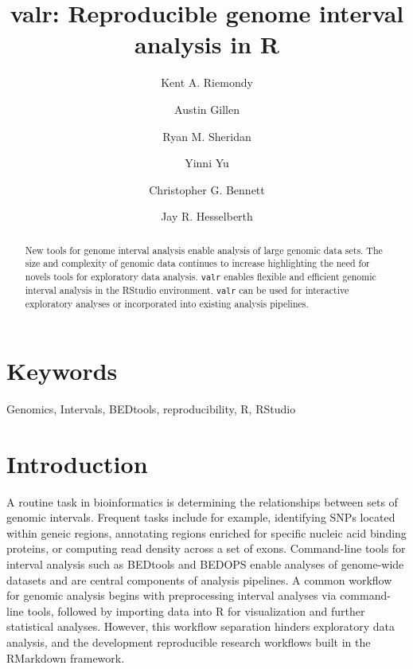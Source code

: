 \documentclass[9pt,a4paper]{extarticle}
\begin{document}
\pagestyle{front}

\title{valr: Reproducible genome interval analysis in R}
\author[1]{Kent A. Riemondy}
\author[1]{Austin Gillen}
\author[2]{Ryan M. Sheridan}
\author[2]{Yinni Yu}
\author[3]{Christopher G. Bennett}
\author[1,2,*]{Jay R. Hesselberth}


\maketitle
\thispagestyle{front}

\begin{abstract}
New tools for genome interval analysis enable analysis of large genomic data sets. The size and complexity of genomic data continues to increase highlighting the need for novels tools for exploratory data analysis. \texttt{valr} enables flexible and efficient genomic interval analysis in the RStudio environment. \texttt{valr} can be used for interactive exploratory analyses or incorporated into existing analysis pipelines.

\end{abstract}

\section*{Keywords}

Genomics, Intervals, BEDtools, reproducibility, R, RStudio

\clearpage
\pagestyle{main}
\section*{Introduction}

A routine task in bioinformatics is determining the relationships between sets of genomic intervals. Frequent tasks include for example, identifying SNPs located within geneic regions, annotating regions enriched for specific nucleic acid binding proteins, or computing read density across a set of exons. Command-line tools for interval analysis such as BEDtools \cite{quinlan_bedtools:_2010} and BEDOPS \cite{neph_bedops:_2012} enable analyses of genome-wide datasets and are central components of analysis pipelines. A common workflow for genomic analysis begins with preprocessing interval analyses via command-line tools, followed by importing data into R for visualization and further statistical analyses. However, this workflow separation hinders exploratory data analysis, and the development reproducible research workflows built in the RMarkdown framework.
\end{document}
